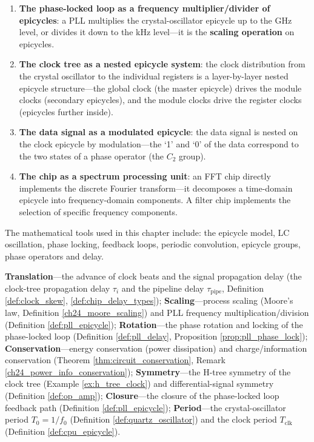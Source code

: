 \begin{remark}
\begin{enumerate}[label=(\arabic*)]
    \item \textbf{The phase-locked loop as a frequency multiplier/divider of epicycles}: a PLL multiplies the crystal-oscillator epicycle up to the GHz level, or divides it down to the kHz level---it is the \textbf{scaling operation} on epicycles.
    \item \textbf{The clock tree as a nested epicycle system}: the clock distribution from the crystal oscillator to the individual registers is a layer-by-layer nested epicycle structure---the global clock (the master epicycle) drives the module clocks (secondary epicycles), and the module clocks drive the register clocks (epicycles further inside).
    \item \textbf{The data signal as a modulated epicycle}: the data signal is nested on the clock epicycle by modulation---the `1' and `0' of the data correspond to the two states of a phase operator (the $C_2$ group).
    \item \textbf{The chip as a spectrum processing unit}: an FFT chip directly implements the discrete Fourier transform---it decomposes a time-domain epicycle into frequency-domain components. A filter chip implements the selection of specific frequency components.
\end{enumerate}
The mathematical tools used in this chapter include: the epicycle model, LC oscillation, phase locking, feedback loops, periodic convolution, epicycle groups, phase operators and delay.
\end{remark}

\begin{remark}\label{rem:circuit_seven_themes}
\textbf{Translation}---the advance of clock beats and the signal propagation delay (the clock-tree propagation delay $\tau_i$ and the pipeline delay $\tau_{\text{pipe}}$, Definition \ref{def:clock_skew}, \ref{def:chip_delay_types}); \textbf{Scaling}---process scaling (Moore's law, Definition \ref{ch24_moore_scaling}) and PLL frequency multiplication/division (Definition \ref{def:pll_epicycle}); \textbf{Rotation}---the phase rotation and locking of the phase-locked loop (Definition \ref{def:pll_delay}, Proposition \ref{prop:pll_phase_lock}); \textbf{Conservation}---energy conservation (power dissipation) and charge/information conservation (Theorem \ref{thm:circuit_conservation}, Remark \ref{ch24_power_info_conservation}); \textbf{Symmetry}---the H-tree symmetry of the clock tree (Example \ref{ex:h_tree_clock}) and differential-signal symmetry (Definition \ref{def:op_amp}); \textbf{Closure}---the closure of the phase-locked loop feedback path (Definition \ref{def:pll_epicycle}); \textbf{Period}---the crystal-oscillator period $T_0=1/f_0$ (Definition \ref{def:quartz_oscillator}) and the clock period $T_{\text{clk}}$ (Definition \ref{def:cpu_epicycle}).
\end{remark}

